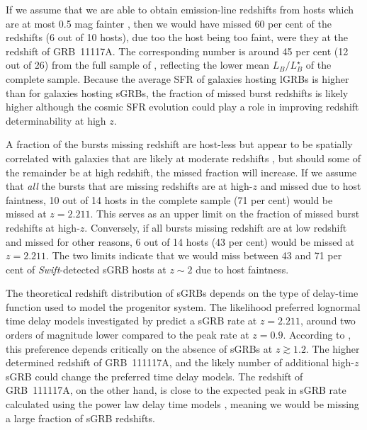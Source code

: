 \documentclass{aa}    %
\begin{document}
If we assume that we are able to obtain emission-line redshifts from hosts which
are at most 0.5 mag fainter \citep[$R < 24.5$~mag;][]{Kruhler2012}, then we
would have missed 60 per cent of the redshifts (6 out of 10 hosts), due too the
host being too faint, were they at the redshift of GRB~11117A. The corresponding
number is around 45 per cent (12 out of 26) from the full sample of
\citet{Berger2014}, reflecting the lower mean $L_B/L^{\star}_{B}$ of the
complete sample. Because the average SFR of galaxies hosting lGRBs is higher
than for galaxies hosting sGRBs, the fraction of missed burst redshifts is
likely higher although the cosmic SFR evolution could play a role in improving
redshift determinability at high $z$.

A fraction of the bursts missing redshift are host-less but appear to be
spatially correlated with galaxies that are likely at moderate redshifts
\citep{Tunnicliffe2014}, but should some of the remainder be at high redshift,
the missed fraction will increase. If we assume that \textit{all} the bursts
that are missing redshifts are at high-$z$ and missed due to host faintness, 10
out of 14 hosts in the complete sample (71 per cent) would be missed at $z =
2.211$. This serves as an upper limit on the fraction of missed burst redshifts
at high-$z$. Conversely, if all bursts missing redshift are at low redshift and
missed for other reasons, 6 out of 14 hosts (43 per cent) would be missed at $z
= 2.211$. The two limits indicate that we would miss between 43 and 71 per cent
of \textit{Swift}-detected sGRB hosts at $z \sim 2$ due to host faintness.

The theoretical redshift distribution of sGRBs depends on the type of delay-time
function used to model the progenitor system. The likelihood preferred lognormal
time delay models investigated by \citet{Wanderman2015} predict a sGRB rate at
$z = 2.211$, around two orders of magnitude lower compared to the peak rate at
$z = 0.9$. According to \citet{Wanderman2015}, this preference depends
critically on the absence of sGRBs at $z \gtrsim 1.2$. The higher determined
redshift of GRB~111117A, and the likely number of additional high-$z$ sGRB could
change the preferred time delay models. The redshift of GRB~111117A, on the
other hand, is close to the expected peak in sGRB rate calculated using the
power law delay time models \citep{Behroozi2014, Wanderman2015, Ghirlanda2016},
meaning we would be missing a large fraction of sGRB redshifts.
\end{document}
